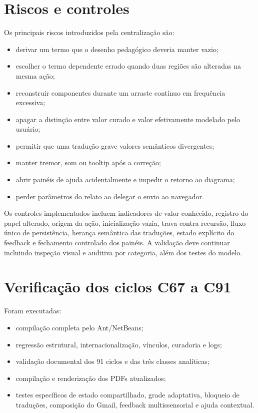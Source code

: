 \documentclass[12pt,a4paper]{article}
\begin{document}
\section{Riscos e controles}

Os principais riscos introduzidos pela centralização são:
\begin{itemize}[noitemsep]
  \item derivar um termo que o desenho pedagógico deveria manter vazio;
  \item escolher o termo dependente errado quando duas regiões são alteradas na mesma ação;
  \item reconstruir componentes durante um arraste contínuo em frequência excessiva;
  \item apagar a distinção entre valor curado e valor efetivamente modelado pelo usuário;
  \item permitir que uma tradução grave valores semânticos divergentes;
  \item manter tremor, som ou tooltip após a correção;
  \item abrir painéis de ajuda acidentalmente e impedir o retorno ao diagrama;
  \item perder parâmetros do relato ao delegar o envio ao navegador.
\end{itemize}

Os controles implementados incluem indicadores de valor conhecido, registro do papel alterado, origem da ação, inicialização vazia, trava contra recursão, fluxo único de persistência, herança semântica das traduções, estado explícito do feedback e fechamento controlado dos painéis. A validação deve continuar incluindo inspeção visual e auditiva por categoria, além dos testes do modelo.

\section{Verificação dos ciclos C67 a C91}

Foram executadas:
\begin{itemize}[noitemsep]
  \item compilação completa pelo Ant/NetBeans;
  \item regressão estrutural, internacionalização, vínculos, curadoria e logs;
  \item validação documental dos 91 ciclos e das três classes analíticas;
  \item compilação e renderização dos PDFs atualizados;
  \item testes específicos de estado compartilhado, grade adaptativa, bloqueio de traduções, composição do Gmail, feedback multissensorial e ajuda contextual.
\end{itemize}
\end{document}
